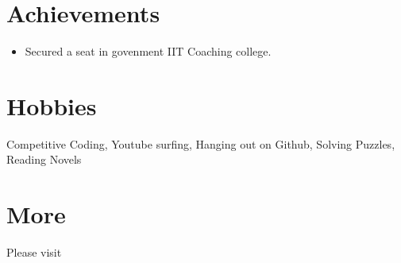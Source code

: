 \documentclass[margin, centered]{res}
\begin{document}
\begin{resume}
\section{Achievements}
\begin{itemize}[leftmargin=*]
 \item Secured a seat in govenment IIT Coaching college.
\end{itemize}




\section{Hobbies}
Competitive Coding, Youtube surfing, Hanging out on Github, Solving Puzzles, Reading Novels

\section{More}
Please visit %

\end{resume}
\end{document}

